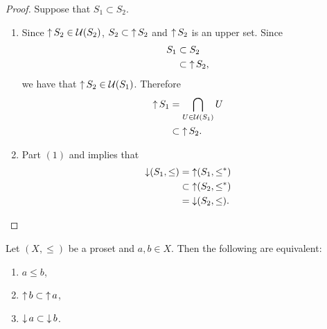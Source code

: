 \documentclass{book}
\begin{document}
	\begin{proof} 
		Suppose that $S_1 \subset S_2$.
		\begin{enumerate}
			\item
			Since $\operatorname{\uparrow} S_2 \in \mathcal{U}(S_2)$, $S_2 \subset \operatorname{\uparrow} S_2$ and $\operatorname{\uparrow} S_2$ is an upper set. Since
			\begin{align*}
				S_1 
				& \subset S_2 \\
				& \subset \operatorname{\uparrow} S_2,
			\end{align*} 
			we have that $\operatorname{\uparrow} S_2 \in \mathcal{U}(S_1)$. Therefore
			\begin{align*}
				\operatorname{\uparrow} S_1
				& = \bigcap\limits_{U \in \mathcal{U}(S_1)} U \\
				& \subset \operatorname{\uparrow} S_2.
			\end{align*}
			\item Part $(1)$ and  implies that 
			\begin{align*}
				\operatorname{\downarrow} (S_1, \leq)
				& = \operatorname{\uparrow} (S_1, \leq^*) \\
				& \subset \operatorname{\uparrow} (S_2, \leq^*) \\
				& = \operatorname{\downarrow} (S_2, \leq).
			\end{align*}
		\end{enumerate}
	\end{proof}
	
	\begin{ex} 
		Let $(X, \leq)$ be a proset and $a,b \in X$. Then the following are equivalent:
		\begin{enumerate}
			\item $a \leq b$,
			\item $\operatorname{\uparrow} b \subset \operatorname{\uparrow} a$,
			\item $\operatorname{\downarrow} a \subset \operatorname{\downarrow} b$.
		\end{enumerate}
	\end{ex}
	
\end{document}
